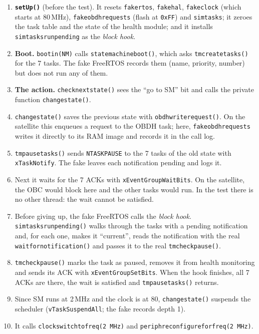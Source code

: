 \documentclass[11pt,a4paper]{article}
\DeclareRobustCommand{\_}{\textunderscore\allowbreak}
\newcommand{\cd}[1]{\texttt{#1}}
\begin{document}
\begin{enumerate}[label=\textbf{\arabic*.}]
\item \textbf{\cd{setUp()}} (before the test). It resets \cd{fake\_rtos}, \cd{fake\_hal},
  \cd{fake\_clock} (which starts at 80\,MHz), \cd{fake\_obdh\_requests} (flash at \cd{0xFF}) and
  \cd{sim\_tasks}; it zeroes the task table and the state of the health module; and it installs
  \cd{sim\_tasks\_run\_pending} as the \emph{block hook}.
\item \textbf{Boot.} \cd{boot\_in(NM)} calls \cd{state\_machine\_boot()}, which asks
  \cd{tm\_create\_tasks()} for the 7 tasks. The fake FreeRTOS records them (name, priority,
  number) but does not run any of them.
\item \textbf{The action.} \cd{check\_next\_state()} sees the ``go to SM'' bit and calls the
  private function \cd{change\_state()}.
\item \cd{change\_state()} saves the previous state with \cd{obdh\_write\_request()}. On the satellite
  this enqueues a request to the OBDH task; here, \cd{fake\_obdh\_requests} writes it
  directly to its RAM image and records it in the call log.
\item \cd{tm\_pause\_tasks()} sends \cd{N\_TASK\_PAUSE} to the 7 tasks of the old state with
  \cd{xTaskNotify}. The fake leaves each notification pending and logs it.
\item Next it waits for the 7 ACKs with \cd{xEventGroupWaitBits}. On the satellite, the OBC would
  block here and the other tasks would run. In the test there is no other thread:
  the wait cannot be satisfied.
\item Before giving up, the fake FreeRTOS calls the \emph{block hook}.
  \cd{sim\_tasks\_run\_pending()} walks through the tasks with a pending notification and, for
  each one, makes it ``current'', reads the notification with the real \cd{wait\_for\_notification()}
  and passes it to the real \cd{tm\_check\_pause()}.
\item \cd{tm\_check\_pause()} marks the task as paused, removes it from health
  monitoring and sends its ACK with \cd{xEventGroupSetBits}. When the hook finishes, all 7 ACKs are there,
  the wait is satisfied and \cd{tm\_pause\_tasks()} returns.
\item Since SM runs at 2\,MHz and the clock is at 80, \cd{change\_state()} suspends the
  scheduler (\cd{vTaskSuspendAll}; the fake records depth 1).
\item It calls \cd{clock\_switch\_to\_freq(2\,MHz)} and \cd{periph\_reconfigure\_for\_freq(2\,MHz)}.

\end{enumerate}
\end{document}
